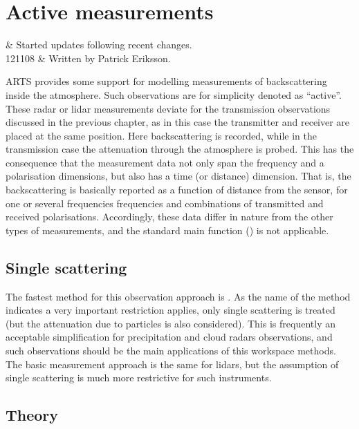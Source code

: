 \chapter{Active measurements}
 \label{sec:cradar}


 & Started updates following recent changes.\\
 121108 & Written by Patrick Eriksson.\\
\stophistory

ARTS provides some support for modelling measurements of backscattering inside
the atmosphere. Such observations are for simplicity denoted as ``active''.
These radar or lidar measurements deviate for the transmission observations
discussed in the previous chapter, as in this case the transmitter and receiver
are placed at the same position. Here backscattering is recorded, while in the
transmission case the attenuation through the atmosphere is probed. This has
the consequence that the measurement data not only span the frequency and a
polarisation dimensions, but also has a time (or distance) dimension. That is,
the backscattering is basically reported as a function of distance from the
sensor, for one or several frequencies frequencies and combinations of
transmitted and received polarisations. Accordingly, these data differ in
nature from the other types of measurements, and the standard main function
() is not applicable.



\section{Single scattering}
\label{sec:cradar:single}

The fastest method for this observation approach is
. As the name of the method indicates a very
important restriction applies, only single scattering is treated (but the
attenuation due to particles is also considered). This is frequently an
acceptable simplification for precipitation and cloud radars observations, and
such observations should be the main applications of this workspace methods.
The basic measurement approach is the same for lidars, but the assumption of
single scattering is much more restrictive for such instruments.

\section{Theory}
\label{sec:cradar:theory}

